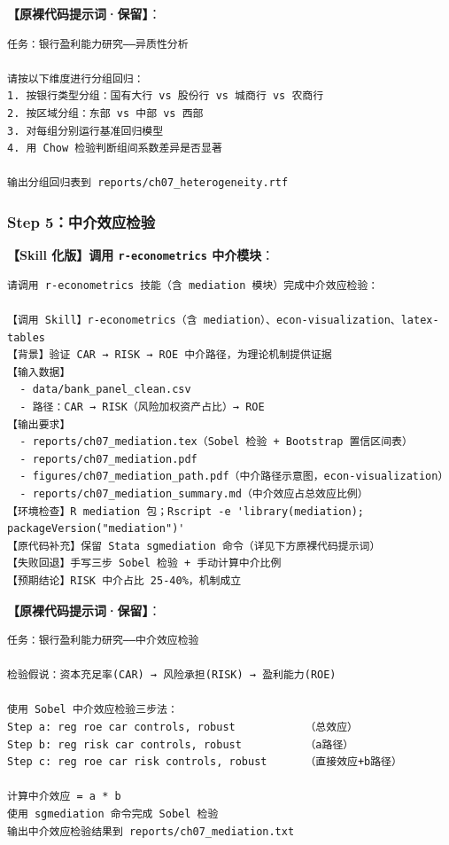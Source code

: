 \textbf{【原裸代码提示词·保留】}：

\begin{lstlisting}
任务：银行盈利能力研究——异质性分析

请按以下维度进行分组回归：
1. 按银行类型分组：国有大行 vs 股份行 vs 城商行 vs 农商行
2. 按区域分组：东部 vs 中部 vs 西部
3. 对每组分别运行基准回归模型
4. 用 Chow 检验判断组间系数差异是否显著

输出分组回归表到 reports/ch07_heterogeneity.rtf
\end{lstlisting}

\subsubsection{Step 5：中介效应检验}

\textbf{【Skill 化版】调用 \texttt{r-econometrics} 中介模块}：

\begin{lstlisting}
请调用 r-econometrics 技能（含 mediation 模块）完成中介效应检验：

【调用 Skill】r-econometrics（含 mediation）、econ-visualization、latex-tables
【背景】验证 CAR → RISK → ROE 中介路径，为理论机制提供证据
【输入数据】
  - data/bank_panel_clean.csv
  - 路径：CAR → RISK（风险加权资产占比）→ ROE
【输出要求】
  - reports/ch07_mediation.tex（Sobel 检验 + Bootstrap 置信区间表）
  - reports/ch07_mediation.pdf
  - figures/ch07_mediation_path.pdf（中介路径示意图，econ-visualization）
  - reports/ch07_mediation_summary.md（中介效应占总效应比例）
【环境检查】R mediation 包；Rscript -e 'library(mediation); packageVersion("mediation")'
【原代码补充】保留 Stata sgmediation 命令（详见下方原裸代码提示词）
【失败回退】手写三步 Sobel 检验 + 手动计算中介比例
【预期结论】RISK 中介占比 25-40%，机制成立
\end{lstlisting}

\textbf{【原裸代码提示词·保留】}：

\begin{lstlisting}
任务：银行盈利能力研究——中介效应检验

检验假说：资本充足率(CAR) → 风险承担(RISK) → 盈利能力(ROE)

使用 Sobel 中介效应检验三步法：
Step a: reg roe car controls, robust           （总效应）
Step b: reg risk car controls, robust          （a路径）
Step c: reg roe car risk controls, robust      （直接效应+b路径）

计算中介效应 = a * b
使用 sgmediation 命令完成 Sobel 检验
输出中介效应检验结果到 reports/ch07_mediation.txt
\end{lstlisting}

